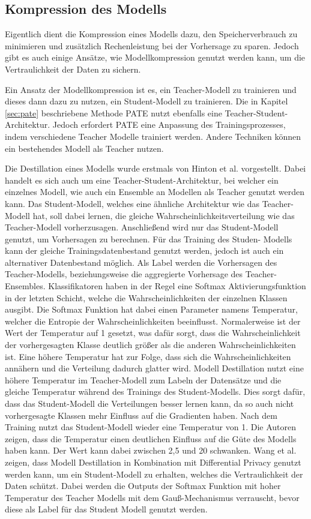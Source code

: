 \subsection{Kompression des Modells}\label{sec:kompression}

Eigentlich dient die Kompression eines Modells dazu, den Speicherverbrauch zu minimieren und zusätzlich Rechenleistung bei der Vorhersage zu sparen.
Jedoch gibt es auch einige Ansätze, wie Modellkompression genutzt werden kann, um die Vertraulichkeit der Daten zu sichern.

Ein Ansatz der Modellkompression ist es, ein Teacher-Modell zu trainieren und dieses dann dazu zu nutzen, ein Student-Modell zu trainieren. 
Die in Kapitel \ref{sec:pate} beschriebene Methode PATE nutzt ebenfalls  eine Teacher-Student-Architektur. 
Jedoch erfordert PATE eine Anpassung des Trainingsprozesses, indem verschiedene Teacher Modelle trainiert werden.
Andere Techniken können ein bestehendes Modell als Teacher nutzen.

Die Destillation eines Modells wurde erstmals von Hinton et al. \cite{P-61} vorgestellt.
Dabei handelt es sich auch um eine Teacher-Student-Architektur, bei welcher ein einzelnes Modell, wie auch ein Ensemble an Modellen als Teacher genutzt werden kann.
Das Student-Modell, welches eine ähnliche Architektur wie das Teacher-Modell hat, soll dabei lernen, die gleiche Wahrscheinlichkeitsverteilung wie das Teacher-Modell vorherzusagen.
Anschließend wird nur das Student-Modell genutzt, um Vorhersagen zu berechnen.
Für das Training des Studen- Modells kann der gleiche Trainingsdatenbestand genutzt werden, jedoch ist auch ein alternativer Datenbestand möglich.
Als Label werden die Vorhersagen des Teacher-Modells, beziehungsweise die aggregierte Vorhersage des Teacher-Ensembles.
Klassifikatoren haben in der Regel eine Softmax Aktivierungsfunktion in der letzten Schicht, welche die Wahrscheinlichkeiten der einzelnen Klassen ausgibt.
Die Softmax Funktion hat dabei einen Parameter namens Temperatur, welcher die Entropie der Wahrscheinlichkeiten beeinflusst. 
Normalerweise ist der Wert der Temperatur auf 1 gesetzt, was dafür sorgt, dass die Wahrscheinlichkeit der vorhergesagten Klasse deutlich größer als die anderen Wahrscheinlichkeiten ist.
Eine höhere Temperatur hat zur Folge, dass sich die Wahrscheinlichkeiten annähern und die Verteilung dadurch glatter wird.
Modell Destillation nutzt eine höhere Temperatur im Teacher-Modell zum Labeln der Datensätze und die gleiche Temperatur während des Trainings des Student-Modells.
Dies sorgt dafür, dass das Student-Modell die Verteilungen besser lernen kann, da so auch nicht vorhergesagte Klassen mehr Einfluss auf die Gradienten haben.
Nach dem Training nutzt das Student-Modell wieder eine Temperatur von 1.
Die Autoren zeigen, dass die Temperatur einen deutlichen Einfluss auf die Güte des Modells haben kann. 
Der Wert kann dabei zwischen 2,5 und 20 schwanken.
Wang et al. \cite{P-64} zeigen, dass Modell Destillation in Kombination mit Differential Privacy genutzt werden kann, um ein Student-Modell zu erhalten, welches die Vertraulichkeit der Daten schützt. 
Dabei werden die Outputs der Softmax Funktion mit hoher Temperatur des Teacher Modells mit dem Gauß-Mechanismus verrauscht, bevor diese als Label für das Student Modell genutzt werden.

